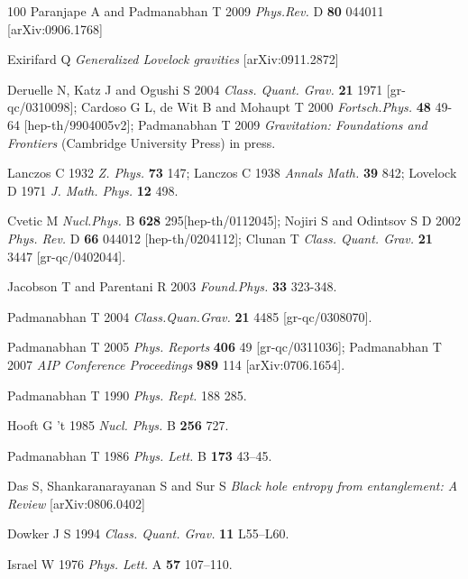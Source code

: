 \documentclass[12pt]{iopart}
\begin{document}
\begin{thebibliography}{100}
Paranjape A and Padmanabhan T 2009 \textit{Phys.Rev. } D \textbf{80} 044011  [arXiv:0906.1768] 
 
Exirifard Q \textit{Generalized Lovelock gravities} [arXiv:0911.2872]


Deruelle  N, Katz J and Ogushi S  2004 
         \textit{Class. Quant. Grav.} {\bf 21} 1971  [gr-qc/0310098];
Cardoso G L, de Wit B and Mohaupt T 2000 
         \textit{Fortsch.Phys.} \textbf{48} 49-64 [hep-th/9904005v2];
Padmanabhan T   2009 
         \textit{Gravitation: Foundations and Frontiers} (Cambridge University Press) in press.
 
 
Lanczos C  1932 {\it Z. Phys.} 
            {\bf 73} 147; 
Lanczos C 1938 {\it Annals Math.} 
            {\bf 39} 842; 
Lovelock D  1971 {\it J. Math. Phys.} 
            {\bf 12} 498. 


Cvetic M  
          \textit{Nucl.Phys.} B \textbf{628} 295[hep-th/0112045]; 
Nojiri S and   Odintsov S D 2002        
          \textit{Phys. Rev.} D  \textbf{66} 044012 [hep-th/0204112];
Clunan T 
          \textit{Class. Quant. Grav.} {\bf 21} 3447  [gr-qc/0402044].

 Jacobson T and   Parentani R  2003 \textit{Found.Phys.} \textbf{33}  323-348.

 
Padmanabhan T 2004  \textit{Class.Quan.Grav.} \textbf{21} 4485  [gr-qc/0308070]. 

      

Padmanabhan T  2005 \textit{Phys. Reports} \textbf{406} 49 [gr-qc/0311036]; 
Padmanabhan T 2007 \textit{AIP Conference Proceedings} \textbf{989}  114 [arXiv:0706.1654]. 


Padmanabhan T 1990 \textit{Phys. Rept.} 188   285.



Hooft G 't 1985 \textit{Nucl. Phys.} B \textbf{256}   727.

Padmanabhan T 1986 \textit{Phys. Lett.} B \textbf{173}   43--45.
 
Das S,  Shankaranarayanan S and  Sur S \textit{Black hole entropy from entanglement: A Review} [arXiv:0806.0402]
 
Dowker J S  1994 \textit{Class. Quant. Grav.} \textbf{11}   L55--L60.

Israel W 1976 \textit{Phys. Lett.} A \textbf{57 } 107--110.


\end{thebibliography}
\end{document}
